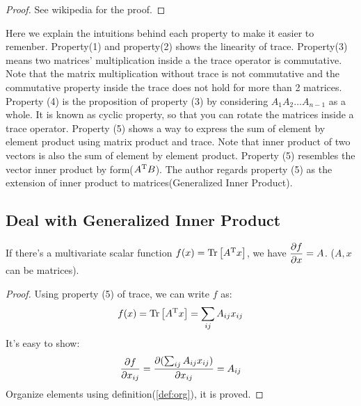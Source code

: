 \begin{proof}
See wikipedia \cite{wiki_trace} for the proof. 
\end{proof}

Here we explain the intuitions behind each property
to make it easier to remenber. Property(1)
and property(2) shows the linearity of trace. 
Property(3) means two matrices' multiplication inside a 
the trace operator is commutative. Note that the matrix 
multiplication without trace is not commutative and 
the commutative property inside the trace does not hold 
for more than 2 matrices. Property (4) is the proposition of 
property (3) by considering $A_1A_2 \ldots A_{n-1}$ 
as a whole. It is known as cyclic property, so that you can 
rotate the matrices inside a trace operator. Property (5) 
shows a way to express the sum of element by element product using 
matrix product and trace. Note that inner product of two vectors 
is also the sum of element by element product. Property (5) 
resembles the vector inner product by form($A^\mathrm{T}B$). 
The author regards property (5) as the extension of inner product 
to matrices(Generalized Inner Product). 

\subsection{Deal with Generalized Inner Product}

\begin{mythm}
	\label{thm:gip}
	If there's a multivariate scalar function $f(x) = \mathrm{Tr}\left[A^\mathrm{T}x\right]$, 
	we have $\dfrac{\partial f}{\partial x} = A$. ($A,x$ can be matrices). 
\end{mythm}

\begin{proof}
	Using property (5) of trace, we can write $f$ as:
	\begin{equation}
		f(x) = \mathrm{Tr}\left[A^\mathrm{T}x\right] = \sum_{ij}A_{ij}x_{ij}
	\end{equation}
	It's easy to show:
	\begin{equation}
		\dfrac{\partial f}{\partial x_{ij}} = \dfrac{\partial (\sum_{ij}A_{ij}x_{ij})}{\partial x_{ij}} = A_{ij}
	\end{equation}
	Organize elements using definition(\ref{def:org}), it is proved. 
\end{proof}

